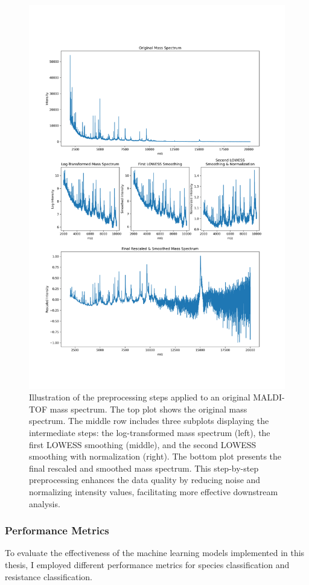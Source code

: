 \documentclass[english,11pt,a4paper,titlepage]{article}
\begin{document}
	\begin{figure}[h]
		\centering
		\includegraphics[width=0.9\linewidth]{img/preprocessing_steps_combined.png}
		\caption{Illustration of the preprocessing steps applied to an original MALDI-TOF mass spectrum. The top plot shows the original mass spectrum. The middle row includes three subplots displaying the intermediate steps: the log-transformed mass spectrum (left), the first LOWESS smoothing (middle), and the second LOWESS smoothing with normalization (right). The bottom plot presents the final rescaled and smoothed mass spectrum. This step-by-step preprocessing enhances the data quality by reducing noise and normalizing intensity values, facilitating more effective downstream analysis.}
		\label{fig:preprocessing_steps}
	\end{figure}
	
	\subsubsection*{Performance Metrics}
	To evaluate the effectiveness of the machine learning models implemented in this thesis, I employed different performance metrics for species classification and resistance classification.
	
\end{document}
